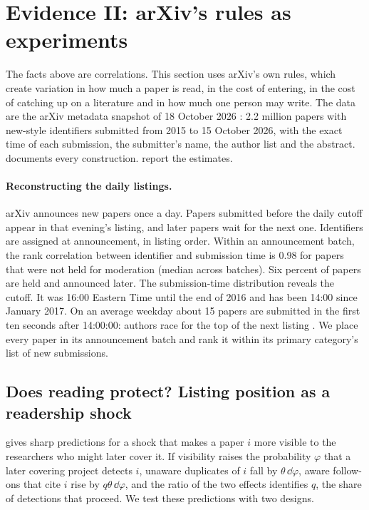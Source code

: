 \section{Evidence II: arXiv's rules as experiments}\label{sec:causal}

The facts above are correlations. This section uses arXiv's own rules, which
create variation in how much a paper is read, in the cost of entering, in the
cost of catching up on a literature and in how much one person may write. The
data are the arXiv metadata snapshot of 18 October 2026 \citep{kaggle2026}:
2.2 million papers with new-style identifiers submitted from 2015 to 15
October 2026, with the exact time of each submission, the submitter's name,
the author list and the abstract.  documents every construction.
 report the estimates.

\paragraph{Reconstructing the daily listings.} arXiv announces new papers once a
day. Papers submitted before the daily cutoff appear in that evening's listing,
and later papers wait for the next one. Identifiers are assigned at announcement,
in listing order. Within an announcement batch, the rank correlation between
identifier and submission time is 0.98 for papers that were not held for
moderation (median across batches). Six percent of papers are held and announced
later. The submission-time distribution reveals the cutoff. It was 16:00
Eastern Time until the end of 2016 and has been 14:00 since January 2017. On an
average weekday about 15 papers are submitted in the first ten seconds after 14:00:00:
authors race for the top of the next listing \citep{haqueginsparg2009}. We
place every paper in its announcement batch and rank it within its primary
category's list of new submissions.

\subsection{Does reading protect? Listing position as a readership shock}

 gives sharp predictions for a shock that makes a paper $i$
more visible to the researchers who might later cover it. If visibility raises
the probability $\varphi$ that a later covering project detects $i$, unaware
duplicates of $i$ fall by $\theta\,\dd\varphi$, aware follow-ons that cite $i$
rise by $q\theta\,\dd\varphi$, and the ratio of the two effects identifies $q$,
the share of detections that proceed. We test these predictions with two
designs.

